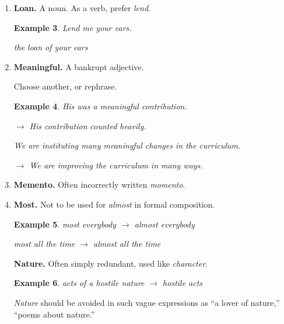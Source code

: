 \documentclass{book}
\numberwithin{equation}{section}
\newtheorem{example}{Example}[chapter]
\begin{document}
\begin{enumerate}
\begin{example}
        $\to$ Mr. B. also spoke to the same effect.
        
        She is studying along the line of French literature.
        
        $\to$ She is studying French literature.
    \end{example}
    \textbf{Literal. Literally.} Often incorrectly used in support of exaggeration or violent metaphor.
    \begin{example}
        a literal flood of abuse $\to$ a flood of abuse
        
        literally dead with fatigue $\to$ almost dead with fatigue
    \end{example}
    \item \textbf{Loan.} A noun. As a verb, prefer \textit{lend}.
    \begin{example}
        Lend me your ears.
        
        the loan of your ears
    \end{example}
    \item \textbf{Meaningful.} A bankrupt adjective.
    
    Choose another, or rephrase.
    \begin{example}
        His was a meaningful contribution.
        
        $\to$ His contribution counted heavily.
        
        We are instituting many meaningful changes in the curriculum.
        
        $\to$ We are improving the curriculum in many ways.
    \end{example}
    \item \textbf{Memento.} Often incorrectly written \textit{momento}.
    \item \textbf{Most.} Not to be used for \textit{almost} in formal composition.
    \begin{example}
        most everybody $\to$ almost everybody
        
        most all the time $\to$ almost all the time
    \end{example}
    \textbf{Nature.} Often simply redundant, used like \textit{character}.
    \begin{example}
        acts of a hostile nature $\to$ hostile acts
    \end{example}
    \textit{Nature} should be avoided in such vague expressions as ``a lover of nature,'' ``poems about nature.''
    

\end{enumerate}
\end{document}
